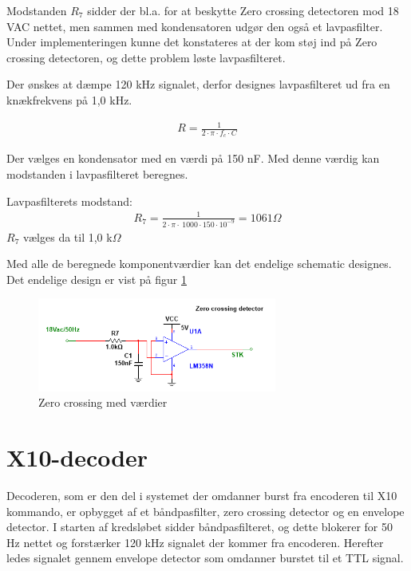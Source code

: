 Modstanden $R_7$ sidder der bl.a. for at beskytte Zero crossing detectoren mod 18 VAC nettet, men sammen med kondensatoren udgør den også et lavpasfilter. Under implementeringen kunne det konstateres at der kom støj ind på Zero crossing detectoren, og dette problem løste lavpasfilteret. 

Der ønskes at dæmpe 120 kHz signalet, derfor designes lavpasfilteret ud fra en knækfrekvens på 1,0 kHz. 

\begin{align}
R = \frac{1}{2 \cdot \pi \cdot f_c \cdot C } 
\end{align}

Der vælges en kondensator med en værdi på 150 nF. Med denne værdig kan modstanden i lavpasfilteret beregnes. 

Lavpasfilterets modstand:
\begin{align}
R_7 = \frac{1}{2 \cdot \pi \cdot \ 1000 \cdot 150 \cdot 10^{-9}} = 1061 \Omega
\end{align}
$R_7$ vælges da til 1,0 k$\Omega$

Med alle de beregnede komponentværdier kan det endelige schematic designes. Det endelige design er vist på figur \ref{fig:ZC_MV} 

\begin{figure}[htbp]
	\centering
	\includegraphics[width=0.70\textwidth]{billeder/HWdesign/ZC_MV}
	\caption{Zero crossing med værdier}
	\label{fig:ZC_MV}
\end{figure}

\newpage

\section{X10-decoder}
Decoderen, som er den del i systemet der omdanner burst fra encoderen til X10 kommando, er opbygget af et båndpasfilter, zero crossing detector og en envelope detector. I starten af kredsløbet sidder båndpasfilteret, og dette blokerer for 50 Hz nettet og forstærker 120 kHz signalet der kommer fra encoderen. Herefter ledes signalet gennem envelope detector som omdanner burstet til et TTL signal.

